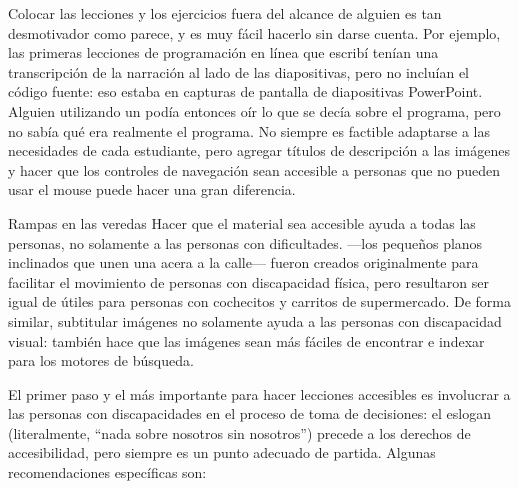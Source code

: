 
Colocar las lecciones y los ejercicios fuera del alcance de alguien es tan desmotivador como parece,
y es muy fácil hacerlo sin darse cuenta.
Por ejemplo,
las primeras lecciones de programación en línea que escribí tenían una transcripción de la narración
al lado de las diapositivas,
pero no incluían el código fuente:
eso estaba en capturas de pantalla de diapositivas PowerPoint.
Alguien utilizando un 
podía entonces oír lo que se decía sobre el programa,
pero no sabía qué era realmente el programa.
No siempre es factible adaptarse a las necesidades de cada estudiante,
pero agregar títulos de descripción a las imágenes
y hacer que los controles de navegación sean accesible a personas que no pueden usar el mouse
puede hacer una gran diferencia.

\begin{aside}{Rampas en las veredas}
  Hacer que el material sea accesible ayuda a todas las personas,
  no solamente a las personas con dificultades.
---los pequeños planos inclinados que unen una acera a la calle---
  fueron creados originalmente para facilitar el movimiento de personas con discapacidad física,
  pero resultaron ser igual de útiles para personas con cochecitos y carritos de supermercado.
  De forma similar,
  subtitular imágenes no solamente ayuda a las personas con discapacidad visual:
  también hace que las imágenes sean más fáciles de encontrar e indexar para los motores de búsqueda.
\end{aside}

El primer paso y el más importante para hacer lecciones accesibles es
involucrar a las personas con discapacidades en el proceso de toma de decisiones:
el eslogan \emph{}
(literalmente, ``nada sobre nosotros sin nosotros'')
precede a los derechos de accesibilidad,
pero siempre es un punto adecuado de partida.
Algunas recomendaciones específicas son:

